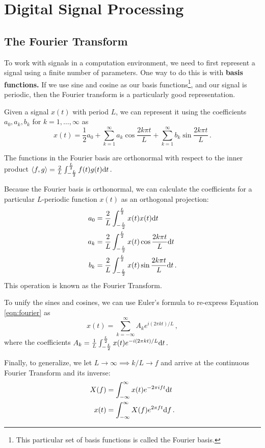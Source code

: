 \chapter{Digital Signal Processing}
\label{chpt:dsp}

\section{The Fourier Transform}

To work with signals in a computation environment, we need to first represent a signal using a finite number of parameters.
One way to do this is with \textbf{basis functions.}
If we use sine and cosine as our basis functions\footnote{This particular set of basis functions is called the Fourier basis.}, and our signal is periodic, then the Fourier transform is a particularly good representation.

\begin{defn}
Given a signal $x(t)$ with period $L$, we can represent it using the coefficients $a_0, a_k, b_k$ for $k=1,\dots,\infty$ as
\begin{equation}
\label{eqn:fourier}
    x(t) = \frac{1}{2}a_0 + \sum_{k=1}^\infty a_k \cos \frac{2k\pi t}{L} + \sum_{k=1}^\infty b_k \sin \frac{2k\pi t}{L} \,.
\end{equation}
\end{defn}

\begin{theorem}
The functions in the Fourier basis are orthonormal with respect to the inner product $\left\langle f, g\right\rangle = \frac{2}{L} \int_{-\frac{L}{2}}^{\frac{L}{2}} f(t)g(t) \mathrm d{t} \,.$
\end{theorem}

\begin{cor}
Because the Fourier basis is orthonormal, we can calculate the coefficients for a particular $L$-periodic function $x(t)$ as an orthogonal projection:
\begin{align*}
    a_0 &= \frac{2}{L} \int_{-\frac{L}{2}}^{\frac{L}{2}} x(t) x(t) \mathrm d{t} \\
    a_k &= \frac{2}{L} \int_{-\frac{L}{2}}^{\frac{L}{2}} x(t) \cos \frac{2k\pi t}{L} \mathrm d{t} \\
    b_k &= \frac{2}{L} \int_{-\frac{L}{2}}^{\frac{L}{2}} x(t) \sin \frac{2k\pi t}{L} \mathrm d{t} \,.
\end{align*}
This operation is known as the Fourier Transform.
\end{cor}

To unify the sines and cosines, we can use Euler's formula to re-express Equation \ref{eqn:fourier} as
\begin{equation}
    x(t) = \sum_{k=-\infty}^\infty A_k e^{i (2 \pi k t) / L} \,,
\end{equation}
where the coefficients $A_k = \frac{1}{L} \int_{-\frac{L}{2}}^{\frac{L}{2}} x(t) e^{-i (2 \pi k t) / L} \mathrm d{t} \,.$

Finally, to generalize, we let $L \rightarrow \infty \implies k/L \rightarrow f$ and arrive at the continuous Fourier Transform and its inverse:
\begin{align*}
    X(f) &= \int_{-\infty}^\infty x(t) e^{-2 \pi i f t} \mathrm d t \\
    x(t) &= \int_{-\infty}^\infty X(f) e^{2 \pi f t} \mathrm d f \,.
\end{align*}
